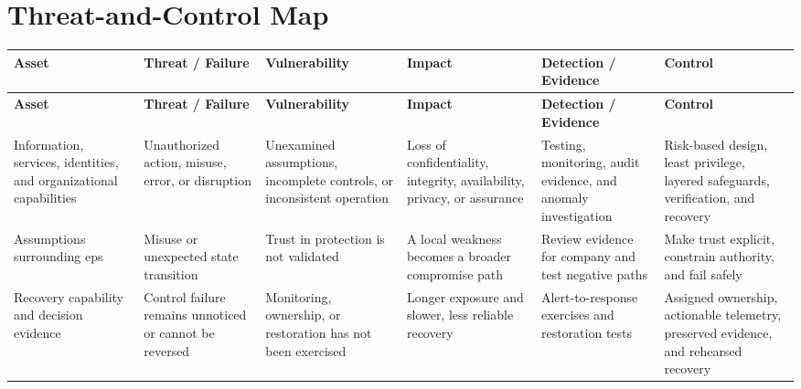 \documentclass[11pt,letterpaper]{article}
\begin{document}
\section*{Threat-and-Control Map}
\begingroup\scriptsize\setlength{\tabcolsep}{2pt}
\begin{longtable}{>{\raggedright\arraybackslash}p{}>{\raggedright\arraybackslash}p{}>{\raggedright\arraybackslash}p{}>{\raggedright\arraybackslash}p{}>{\raggedright\arraybackslash}p{}>{\raggedright\arraybackslash}p{}}
\toprule\rowcolor{Navy}\color{white}\textbf{Asset} & \color{white}\textbf{Threat / Failure} & \color{white}\textbf{Vulnerability} & \color{white}\textbf{Impact} & \color{white}\textbf{Detection / Evidence} & \color{white}\textbf{Control}\\\midrule
\endfirsthead
\toprule\rowcolor{Navy}\color{white}\textbf{Asset} & \color{white}\textbf{Threat / Failure} & \color{white}\textbf{Vulnerability} & \color{white}\textbf{Impact} & \color{white}\textbf{Detection / Evidence} & \color{white}\textbf{Control}\\\midrule
\endhead
Information, services, identities, and organizational capabilities & Unauthorized action, misuse, error, or disruption & Unexamined assumptions, incomplete controls, or inconsistent operation & Loss of confidentiality, integrity, availability, privacy, or assurance & Testing, monitoring, audit evidence, and anomaly investigation & Risk-based design, least privilege, layered safeguards, verification, and recovery\\\midrule
Assumptions surrounding eps & Misuse or unexpected state transition & Trust in protection is not validated & A local weakness becomes a broader compromise path & Review evidence for company and test negative paths & Make trust explicit, constrain authority, and fail safely\\\midrule
Recovery capability and decision evidence & Control failure remains unnoticed or cannot be reversed & Monitoring, ownership, or restoration has not been exercised & Longer exposure and slower, less reliable recovery & Alert-to-response exercises and restoration tests & Assigned ownership, actionable telemetry, preserved evidence, and rehearsed recovery\\\midrule
\bottomrule
\end{longtable}
\endgroup
\end{document}
